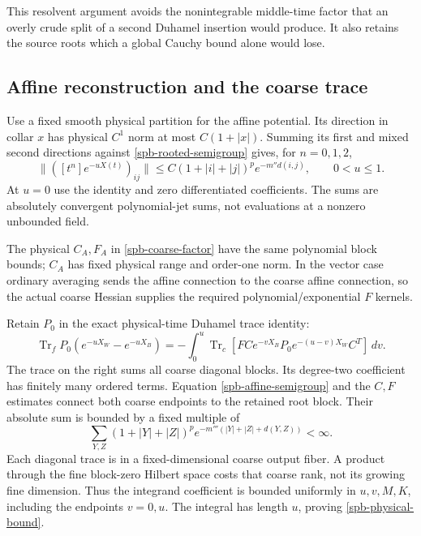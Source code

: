 \documentclass[11pt]{article}
\theoremstyle{remark}
\begin{document}
This resolvent argument avoids the nonintegrable middle-time factor
that an overly crude split of a second Duhamel insertion would produce.
It also retains the source roots which a global Cauchy bound alone
would lose.

\subsection{Affine reconstruction and the coarse trace}
\label{spb-trace}

Use a fixed smooth physical partition for the affine potential.
Its direction in collar $x$ has physical $C^1$ norm at most
$C(1+|x|)$. Summing its first and mixed second directions against
\eqref{spb-rooted-semigroup} gives, for $n=0,1,2$,
\begin{equation}
 \|([t^n]e^{-uX(t)})_{ij}\|
 \le C(1+|i|+|j|)^p e^{-m''d(i,j)},\qquad 0<u\le1.
 \label{spb-affine-semigroup}
\end{equation}
At $u=0$ use the identity and zero differentiated coefficients.
The sums are absolutely convergent polynomial-jet sums, not evaluations
at a nonzero unbounded field.

The physical $C_A,F_A$ in \eqref{spb-coarse-factor} have the same
polynomial block bounds; $C_A$ has fixed physical range and order-one
norm. In the vector case ordinary averaging sends the affine connection
to the coarse affine connection, so the actual coarse Hessian supplies
the required polynomial/exponential $F$ kernels.

Retain $P_0$ in the exact physical-time Duhamel trace identity:
\begin{equation}
 \operatorname{Tr}_fP_0(e^{-uX_W}-e^{-uX_B})
  =-\int_0^u\operatorname{Tr}_c
       [FCe^{-vX_B}P_0e^{-(u-v)X_W}C^T]\,dv.
 \label{spb-coarse-duhamel}
\end{equation}
The trace on the right sums all coarse diagonal blocks.
Its degree-two coefficient has finitely many ordered terms.
Equation \eqref{spb-affine-semigroup} and the $C,F$ estimates connect
both coarse endpoints to the retained root block. Their absolute
sum is bounded by a fixed multiple of
\[
 \sum_{Y,Z}(1+|Y|+|Z|)^p
            e^{-m'''(|Y|+|Z|+d(Y,Z))}<\infty.
\]
Each diagonal trace is in a fixed-dimensional coarse output fiber.
A product through the fine block-zero Hilbert space costs that coarse
rank, not its growing fine dimension. Thus the integrand coefficient
is bounded uniformly in $u,v,M,K$, including the endpoints $v=0,u$.
The integral has length $u$, proving \eqref{spb-physical-bound}.
\end{document}
